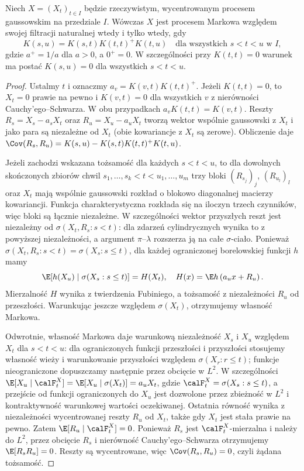 \begin{stwierdzenie}
Niech $X=(X_t)_{t\in I}$ będzie rzeczywistym, wycentrowanym
procesem gaussowskim na przedziale $I$.
Wówczas $X$ jest procesem Markowa względem swojej
filtracji naturalnej wtedy i tylko wtedy, gdy
\[
K(s,u)=K(s,t)K(t,t)^+K(t,u)
\quad\text{dla wszystkich }s<t<u\text{ w }I,
\]
gdzie $a^+=1/a$ dla $a>0$, a $0^+=0$.
W szczególności przy $K(t,t)=0$ warunek ma postać
$K(s,u)=0$ dla wszystkich $s<t<u$.
\end{stwierdzenie}
\begin{proof}
Ustalmy $t$ i oznaczmy $a_v=K(v,t)K(t,t)^+$.
Jeżeli $K(t,t)=0$, to $X_t=0$ prawie na pewno
i $K(v,t)=0$ dla wszystkich $v$ z nierówności
Cauchy'ego--Schwarza. W obu przypadkach
$a_v K(t,t)=K(v,t)$.
Reszty $R_s=X_s-a_sX_t$ oraz $R_u=X_u-a_uX_t$
tworzą wektor wspólnie gaussowski z $X_t$ i jako para
są niezależne od $X_t$ (obie kowariancje z $X_t$ są zerowe). Obliczenie daje
$\Cov(R_s,R_u)=K(s,u)-K(s,t)K(t,t)^+K(t,u)$.

Jeżeli zachodzi wskazana tożsamość dla każdych $s<t<u$,
to dla dowolnych skończonych zbiorów chwil
$s_1,\ldots,s_k<t<u_1,\ldots,u_m$ trzy bloki
$(R_{s_j})_j$, $(R_{u_l})_l$ oraz $X_t$ mają wspólnie
gaussowski rozkład o blokowo diagonalnej macierzy
kowariancji. Funkcja charakterystyczna rozkłada się
na iloczyn trzech czynników, więc bloki są łącznie
niezależne. W szczególności wektor przyszłych reszt
jest niezależny od $\sigma(X_t,R_s:s<t)$: dla
zdarzeń cylindrycznych wynika to z powyższej
niezależności, a argument $\pi$--$\lambda$ rozszerza
ją na całe $\sigma$-ciało. Ponieważ
$\sigma(X_t,R_s:s<t)=\sigma(X_s:s\le t)$,
dla każdej ograniczonej borelowskiej funkcji $h$ mamy
\[
\E[h(X_u)\mid\sigma(X_s:s\le t)]
=H(X_t),\quad H(x)=\E h\left(
a_ux+R_u\right).
\]
Mierzalność $H$ wynika z twierdzenia Fubiniego,
a tożsamość z niezależności $R_u$ od przeszłości.
Warunkując jeszcze względem $\sigma(X_t)$,
otrzymujemy własność Markowa.

Odwrotnie, własność Markowa daje warunkową niezależność
$X_s$ i $X_u$ względem $X_t$ dla $s<t<u$: dla
ograniczonych funkcji przeszłości i przyszłości stosujemy
własność wieży i warunkowanie przyszłości względem
$\sigma(X_r:r\le t)$; funkcje nieograniczone dopuszczamy
następnie przez obcięcie w $L^2$. W szczególności $\E[X_u\mid\calF_t^X]
=\E[X_u\mid\sigma(X_t)]=a_uX_t$,
gdzie $\calF_t^X=\sigma(X_s:s\le t)$, a przejście
od funkcji ograniczonych do $X_u$ jest dozwolone przez
zbieżność w $L^2$ i kontraktywność warunkowej wartości
oczekiwanej. Ostatnia równość wynika z niezależności
wycentrowanej reszty $R_u$ od $X_t$, także gdy $X_t$
jest stała prawie na pewno. Zatem $\E[R_u\mid\calF_t^X]=0$.
Ponieważ $R_s$ jest $\calF_t^X$-mierzalna i należy do $L^2$,
przez obcięcie $R_s$ i nierówność Cauchy'ego--Schwarza
otrzymujemy $\E[R_sR_u]=0$. Reszty są wycentrowane,
więc $\Cov(R_s,R_u)=0$, czyli żądana tożsamość.
\end{proof}


